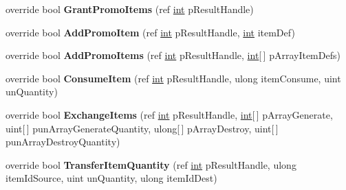 \begin{DoxyCompactItemize}
\item 
\hypertarget{classValve_1_1Steamworks_1_1CSteamInventory_a4d221e6b00e37e9ebd60fbbbbad997a3}{}override bool {\bfseries Grant\+Promo\+Items} (ref \hyperlink{SDL__thread_8h_a6a64f9be4433e4de6e2f2f548cf3c08e}{int} p\+Result\+Handle)\label{classValve_1_1Steamworks_1_1CSteamInventory_a4d221e6b00e37e9ebd60fbbbbad997a3}

\item 
\hypertarget{classValve_1_1Steamworks_1_1CSteamInventory_a11cc0ae7710fa4f49b1349a836eedc49}{}override bool {\bfseries Add\+Promo\+Item} (ref \hyperlink{SDL__thread_8h_a6a64f9be4433e4de6e2f2f548cf3c08e}{int} p\+Result\+Handle, \hyperlink{SDL__thread_8h_a6a64f9be4433e4de6e2f2f548cf3c08e}{int} item\+Def)\label{classValve_1_1Steamworks_1_1CSteamInventory_a11cc0ae7710fa4f49b1349a836eedc49}

\item 
\hypertarget{classValve_1_1Steamworks_1_1CSteamInventory_a112f95dc36a8e46c94a5b6e9570bf66c}{}override bool {\bfseries Add\+Promo\+Items} (ref \hyperlink{SDL__thread_8h_a6a64f9be4433e4de6e2f2f548cf3c08e}{int} p\+Result\+Handle, \hyperlink{SDL__thread_8h_a6a64f9be4433e4de6e2f2f548cf3c08e}{int}\mbox{[}$\,$\mbox{]} p\+Array\+Item\+Defs)\label{classValve_1_1Steamworks_1_1CSteamInventory_a112f95dc36a8e46c94a5b6e9570bf66c}

\item 
\hypertarget{classValve_1_1Steamworks_1_1CSteamInventory_a2fa6dc1bd97d5262c9c143659cc1f2a3}{}override bool {\bfseries Consume\+Item} (ref \hyperlink{SDL__thread_8h_a6a64f9be4433e4de6e2f2f548cf3c08e}{int} p\+Result\+Handle, ulong item\+Consume, uint un\+Quantity)\label{classValve_1_1Steamworks_1_1CSteamInventory_a2fa6dc1bd97d5262c9c143659cc1f2a3}

\item 
\hypertarget{classValve_1_1Steamworks_1_1CSteamInventory_a80b5964ef6eed27d5ca7abf8101628b2}{}override bool {\bfseries Exchange\+Items} (ref \hyperlink{SDL__thread_8h_a6a64f9be4433e4de6e2f2f548cf3c08e}{int} p\+Result\+Handle, \hyperlink{SDL__thread_8h_a6a64f9be4433e4de6e2f2f548cf3c08e}{int}\mbox{[}$\,$\mbox{]} p\+Array\+Generate, uint\mbox{[}$\,$\mbox{]} pun\+Array\+Generate\+Quantity, ulong\mbox{[}$\,$\mbox{]} p\+Array\+Destroy, uint\mbox{[}$\,$\mbox{]} pun\+Array\+Destroy\+Quantity)\label{classValve_1_1Steamworks_1_1CSteamInventory_a80b5964ef6eed27d5ca7abf8101628b2}

\item 
\hypertarget{classValve_1_1Steamworks_1_1CSteamInventory_a045d9ef54470683de0ec490742c63296}{}override bool {\bfseries Transfer\+Item\+Quantity} (ref \hyperlink{SDL__thread_8h_a6a64f9be4433e4de6e2f2f548cf3c08e}{int} p\+Result\+Handle, ulong item\+Id\+Source, uint un\+Quantity, ulong item\+Id\+Dest)\label{classValve_1_1Steamworks_1_1CSteamInventory_a045d9ef54470683de0ec490742c63296}


\end{DoxyCompactItemize}
